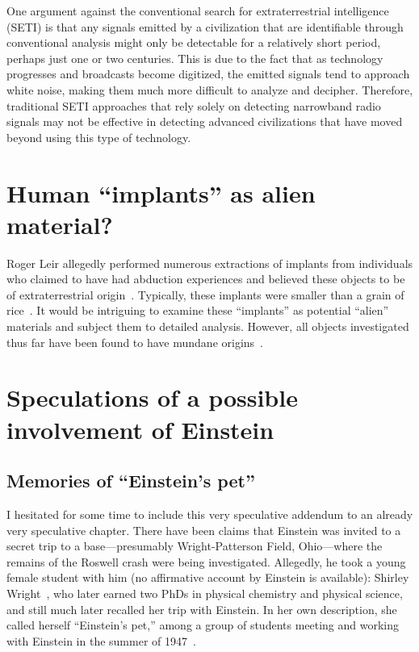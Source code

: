 One argument against the conventional search for extraterrestrial intelligence (SETI) is that any signals emitted by a civilization that are identifiable through conventional analysis might only be detectable for a relatively short period, perhaps just one or two centuries. This is due to the fact that as technology progresses and broadcasts become digitized, the emitted signals tend to approach white noise, making them much more difficult to analyze and decipher. Therefore, traditional SETI approaches that rely solely on detecting narrowband radio signals may
not be effective in detecting advanced civilizations that have moved beyond using this type of technology.

\section{Human ``implants'' as alien material?}


Roger Leir allegedly performed numerous extractions of implants from individuals who claimed to have had abduction experiences and believed these objects to be of extraterrestrial origin~\cite{Leir2000}. Typically, these implants were smaller than a grain of rice~\cite{DolanDisclosure2018Sep}. It would be intriguing to examine these ``implants'' as potential ``alien'' materials and subject them to detailed analysis. However, all objects investigated thus far have been found to have mundane origins~\cite{ScottLittle-implant}.



\section{Speculations of a possible involvement of Einstein}
\label{2023-UFO-part-Perception-crash-retreivals-einstein}

\subsection{Memories of ``Einstein's pet''}

I hesitated for some time to include this very speculative addendum to an already very speculative chapter.
There have been claims that Einstein was invited to a secret trip to a base---presumably Wright-Patterson Field, Ohio---where
the remains of the Roswell crash were being investigated.
Allegedly, he took a young female student with him (no affirmative account by Einstein is available):
Shirley Wright~\cite{ShirleyWrightObituaryLegacy2015Jul}, who later earned two PhDs in physical chemistry and physical science,
and still much later recalled her trip with Einstein.
In her own description, she
called herself ``Einstein's pet,''
among a group of students meeting and working with Einstein in the summer of 1947~\cite{BragaliaEinstein}.

